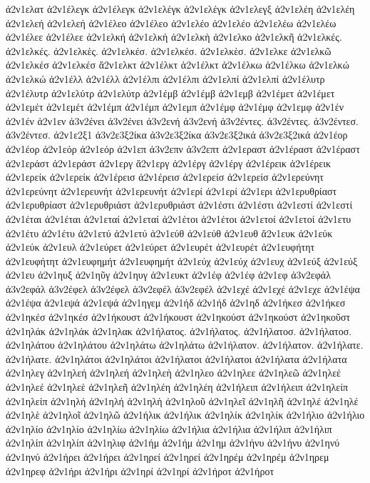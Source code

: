 {ἀ2ν1ελατ
ἀ2ν1έλεγκ  ἀ2ν1έλεγκ
ἀ2ν1ελέγκ  ἀ2ν1ελέγκ
ἀ2ν1ελεγξ
ἀ2ν1ελέη  ἀ2ν1ελέη
ἀ2ν1ελεή  ἀ2ν1ελεή
ἀ2ν1έλεο  ἀ2ν1έλεο
ἀ2ν1ελέο  ἀ2ν1ελέο
ἀ2ν1ελέω  ἀ2ν1ελέω
ἀ2ν1έλεε  ἀ2ν1έλεε
ἀ2ν1ελκή  ἀ2ν1ελκή
ἀ2ν1ελκὴ
ἀ2ν1ελκο
ἀ2ν1ελκῆ
ἀ2ν1ελκές.  ἀ2ν1ελκές.
ἀ2ν1ελκὲς.
ἀ2ν1ελκέσ.  ἀ2ν1ελκέσ.
ἀ2ν1ελκὲσ.
ἀ2ν1ελκε
ἀ2ν1ελκῶ
ἀ2ν1ελκέσ  ἀ2ν1ελκέσ
ἄ2ν1ελκτ
ἀ2ν1έλκτ  ἀ2ν1έλκτ
ἀ2ν1έλκω  ἀ2ν1έλκω
ἀ2ν1ελκώ  ἀ2ν1ελκώ
ἀ2ν1έλλ  ἀ2ν1έλλ
ἀ2ν1έλπι  ἀ2ν1έλπι
ἀ2ν1ελπί  ἀ2ν1ελπί
ἀ2ν1έλυτρ  ἀ2ν1έλυτρ
ἀ2ν1ελύτρ  ἀ2ν1ελύτρ
ἀ2ν1έμβ  ἀ2ν1έμβ
ἀ2ν1εμβ
ἀ2ν1έμετ  ἀ2ν1έμετ
ἀ2ν1εμέτ  ἀ2ν1εμέτ
ἀ2ν1έμπ  ἀ2ν1έμπ
ἀ2ν1εμπ
ἀ2ν1έμφ  ἀ2ν1έμφ
ἀ2ν1εμφ
ἀ2ν1έν  ἀ2ν1έν
ἀ2ν1εν
ἀ3ν2ένει  ἀ3ν2ένει
ἀ3ν2ενή  ἀ3ν2ενή
ἀ3ν2έντες.  ἀ3ν2έντες.
ἀ3ν2έντεσ.  ἀ3ν2έντεσ.
ἀ2ν1ε2ξ1
ἀ3ν2ε3ξ2ίκα  ἀ3ν2ε3ξ2ίκα
ἀ3ν2ε3ξ2ικά  ἀ3ν2ε3ξ2ικά
ἀ2ν1έορ  ἀ2ν1έορ
ἀ2ν1εόρ  ἀ2ν1εόρ
ἀ2ν1επ
ἀ3ν2επν
ἀ3ν2επτ
ἀ2ν1εραστ
ἀ2ν1έραστ  ἀ2ν1έραστ
ἀ2ν1εράστ  ἀ2ν1εράστ
ἀ2ν1εργ
ἄ2ν1εργ
ἀ2ν1έργ  ἀ2ν1έργ
ἀ2ν1έρεικ  ἀ2ν1έρεικ
ἀ2ν1ερείκ  ἀ2ν1ερείκ
ἀ2ν1έρεισ  ἀ2ν1έρεισ
ἀ2ν1ερείσ  ἀ2ν1ερείσ
ἀ2ν1ερεύνητ  ἀ2ν1ερεύνητ
ἀ2ν1ερευνήτ  ἀ2ν1ερευνήτ
ἀ2ν1ερί  ἀ2ν1ερί
ἀ2ν1ερι
ἀ2ν1ερυθρίαστ  ἀ2ν1ερυθρίαστ
ἀ2ν1ερυθριάστ  ἀ2ν1ερυθριάστ
ἀ2ν1έστι  ἀ2ν1έστι
ἀ2ν1εστί  ἀ2ν1εστί
ἀ2ν1έται  ἀ2ν1έται
ἀ2ν1εταί  ἀ2ν1εταί
ἀ2ν1έτοι  ἀ2ν1έτοι
ἀ2ν1ετοί  ἀ2ν1ετοί
ἀ2ν1ετυ
ἀ2ν1έτυ  ἀ2ν1έτυ
ἀ2ν1ετύ  ἀ2ν1ετύ
ἀ2ν1εύθ  ἀ2ν1εύθ
ἀ2ν1ευθ
ἄ2ν1ευκ
ἀ2ν1εύκ  ἀ2ν1εύκ
ἀ2ν1ευλ
ἀ2ν1εύρετ  ἀ2ν1εύρετ
ἀ2ν1ευρέτ  ἀ2ν1ευρέτ
ἀ2ν1ευφήτητ  ἀ2ν1ευφήτητ
ἀ2ν1ευφημήτ  ἀ2ν1ευφημήτ
ἀ2ν1εύχ  ἀ2ν1εύχ
ἀ2ν1ευχ
ἀ2ν1εύξ  ἀ2ν1εύξ
ἀ2ν1ευ
ἀ2ν1ηυξ
ἀ2ν1ηῦγ
ἀ2ν1ηυγ
ἀ2ν1ευκτ
ἀ2ν1έφ  ἀ2ν1έφ
ἀ2ν1εφ
ἀ3ν2εφάλ  ἀ3ν2εφάλ
ἀ3ν2έφελ  ἀ3ν2έφελ
ἀ3ν2εφέλ  ἀ3ν2εφέλ
ἀ2ν1εχέ  ἀ2ν1εχέ
ἀ2ν1εχε
ἀ2ν1έψα  ἀ2ν1έψα
ἀ2ν1εψά  ἀ2ν1εψά
ἀ2ν1ηγεμ
ἀ2ν1ήδ  ἀ2ν1ήδ
ἀ2ν1ηδ
ἀ2ν1ήκεσ  ἀ2ν1ήκεσ
ἀ2ν1ηκέσ  ἀ2ν1ηκέσ
ἀ2ν1ήκουστ  ἀ2ν1ήκουστ
ἀ2ν1ηκούστ  ἀ2ν1ηκούστ
ἀ2ν1ηκοῦστ
ἀ2ν1ηλάκ  ἀ2ν1ηλάκ
ἀ2ν1ηλακ
ἀ2ν1ήλατος.  ἀ2ν1ήλατος.
ἀ2ν1ήλατοσ.  ἀ2ν1ήλατοσ.
ἀ2ν1ηλάτου  ἀ2ν1ηλάτου
ἀ2ν1ηλάτω  ἀ2ν1ηλάτω
ἀ2ν1ήλατον.  ἀ2ν1ήλατον.
ἀ2ν1ήλατε.  ἀ2ν1ήλατε.
ἀ2ν1ηλάτοι  ἀ2ν1ηλάτοι
ἀ2ν1ήλατοι  ἀ2ν1ήλατοι
ἀ2ν1ήλατα  ἀ2ν1ήλατα
ἀ2ν1ηλεγ
ἀ2ν1ηλεή  ἀ2ν1ηλεή
ἀ2ν1ηλεὴ
ἀ2ν1ηλεο
ἀ2ν1ηλεε
ἀ2ν1ηλεῶ
ἀ2ν1ηλεέ  ἀ2ν1ηλεέ
ἀ2ν1ηλεὲ
ἀ2ν1ηλεῆ
ἀ2ν1ηλέη  ἀ2ν1ηλέη
ἀ2ν1ήλειπ  ἀ2ν1ήλειπ
ἀ2ν1ηλείπ  ἀ2ν1ηλείπ
ἀ2ν1ηλή  ἀ2ν1ηλή
ἀ2ν1ηλὴ
ἀ2ν1ηλοῦ
ἀ2ν1ηλεῖ
ἀ2ν1ηλῆ
ἀ2ν1ηλέ  ἀ2ν1ηλέ
ἀ2ν1ηλὲ
ἀ2ν1ηλοῖ
ἀ2ν1ηλῶ
ἀ2ν1ήλικ  ἀ2ν1ήλικ
ἀ2ν1ηλίκ  ἀ2ν1ηλίκ
ἀ2ν1ήλιο  ἀ2ν1ήλιο
ἀ2ν1ηλίο  ἀ2ν1ηλίο
ἀ2ν1ηλίω  ἀ2ν1ηλίω
ἀ2ν1ήλια  ἀ2ν1ήλια
ἀ2ν1ήλιπ  ἀ2ν1ήλιπ
ἀ2ν1ηλίπ  ἀ2ν1ηλίπ
ἀ2ν1ηλιφ
ἀ2ν1ήμ  ἀ2ν1ήμ
ἀ2ν1ημ
ἀ2ν1ήνυ  ἀ2ν1ήνυ
ἀ2ν1ηνύ  ἀ2ν1ηνύ
ἀ2ν1ήρει  ἀ2ν1ήρει
ἀ2ν1ηρεί  ἀ2ν1ηρεί
ἀ2ν1ηρέμ  ἀ2ν1ηρέμ
ἀ2ν1ηρεμ
ἀ2ν1ηρεφ
ἀ2ν1ήρι  ἀ2ν1ήρι
ἀ2ν1ηρί  ἀ2ν1ηρί
ἀ2ν1ήροτ  ἀ2ν1ήροτ
}
